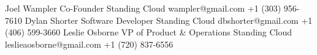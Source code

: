 
\begin{referees}
		{Joel Wampler}
		{Co-Founder}
		{Standing Cloud}
		{wampler@gmail.com}
    {+1 (303) 956-7610}
    {Dylan Shorter}
    {Software Developer}
    {Standing Cloud}
    {dbshorter@gmail.com}
    {+1 (406) 599-3660}
    {Leslie Osborne}
    {VP of Product \& Operations}
    {Standing Cloud}
    {leslieaosborne@gmail.com}
    {+1 (720) 837-6556}
\end{referees}
